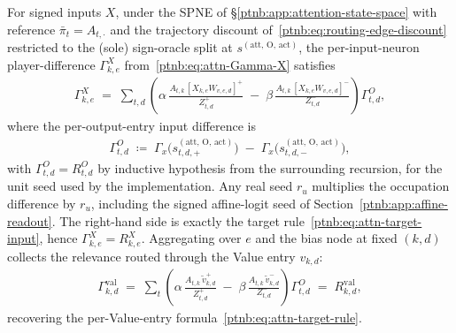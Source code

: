\begin{theoremenv}\label{ptnb:thm:attn-ab-recovery}\label{thm:attention_ab_recovery}
For signed inputs $X$, under the SPNE of \S\ref{ptnb:app:attention-state-space} with reference
$\bar\pi_t = A_{t,\cdot}$ and the trajectory discount of~\eqref{ptnb:eq:routing-edge-discount}
restricted to the (sole) sign-oracle split at $s^{(\mathrm{att},\,\mathrm{O},\,\mathrm{act})}$, the
per-input-neuron player-difference $\Gamma^{X}_{k,e}$ from~\eqref{ptnb:eq:attn-Gamma-X} satisfies
\begin{align}\label{ptnb:eq:attn-ab-recovery}
    \Gamma^{X}_{k,e}
    \;=\;
    \sum_{t,d} \left(
    \alpha\, \frac{A_{t,k}\, [X_{k,e} W_{v,e,d}]^+}{Z_{t,d}^+}
    \;-\;
    \beta\, \frac{A_{t,k}\, [X_{k,e} W_{v,e,d}]^-}{Z_{t,d}^-}
    \right) \Gamma^{O}_{t,d},
\end{align}
where the per-output-entry input difference is
\begin{align}\label{ptnb:eq:attn-Gamma-O}
    \Gamma^{O}_{t,d} \;\coloneqq\;
    \Gamma_x\!\bigl(s_{t,d,+}^{(\mathrm{att},\,\mathrm{O},\,\mathrm{act})}\bigr) \;-\;
    \Gamma_x\!\bigl(s_{t,d,-}^{(\mathrm{att},\,\mathrm{O},\,\mathrm{act})}\bigr),
\end{align}
with $\Gamma^{O}_{t,d} = R^{O}_{t,d}$ by inductive hypothesis from the surrounding recursion, for
the unit seed used by the implementation. Any real seed $r_u$ multiplies the occupation difference
by $r_u$, including the signed affine-logit seed of Section~\ref{ptnb:app:affine-readout}. The right-hand side is exactly the target
rule~\eqref{ptnb:eq:attn-target-input}, hence $\Gamma^{X}_{k,e} = R^{X}_{k,e}$. Aggregating over $e$ and
the bias node at fixed $(k,d)$ collects the relevance routed through the Value entry $v_{k,d}$:
\begin{align}\label{ptnb:eq:attn-Gamma-V-corollary}
    \Gamma^{\mathrm{val}}_{k,d}
    \;=\;
    \sum_t \left( \alpha\, \frac{A_{t,k}\, \tilde{v}_{k,d}^+}{Z_{t,d}^+} \;-\; \beta\, \frac{A_{t,k}\,
    \tilde{v}_{k,d}^-}{Z_{t,d}^-} \right) \Gamma^{O}_{t,d}
    \;=\; R^{\mathrm{val}}_{k,d},
\end{align}
recovering the per-Value-entry formula~\eqref{ptnb:eq:attn-target-rule}.\end{theoremenv}

